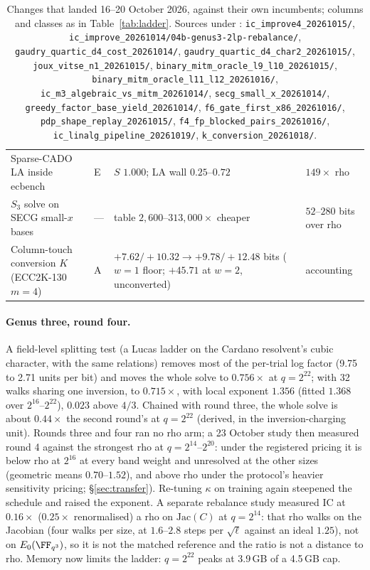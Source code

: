 \begin{table}[p]
\begin{tabularx}{\linewidth}{@{}>{\raggedright}Xl>{\raggedright}p{3.6cm}>{\raggedright\arraybackslash}p{3.2cm}@{}}
Sparse-CADO LA inside ecbench & E & $S$ $1.000$; LA wall $0.25$--$0.72$ & $149\times$ rho \\
$S_3$ solve on SECG small-$x$ bases & --- & table $2{,}600$--$313{,}000\times$ cheaper & $52$--$280$ bits over rho \\
Column-touch conversion $K$ (ECC2K-130 $m=4$) & A & $+7.62/+10.32\to+9.78/+12.48$ bits ($w=1$ floor; $+45.71$ at $w=2$, unconverted) & accounting \\
\bottomrule
\end{tabularx}
\caption[]{Changes that landed 16--20 October 2026, against their own
incumbents; columns and classes as in Table~\ref{tab:ladder}. Sources under
: \texttt{ic\_improve4\_20261015/},
\texttt{ic\_improve\_20261014/04b-genus3-2lp-rebalance/},
\texttt{gaudry\_quartic\_d4\_cost\_20261014/},
\texttt{gaudry\_quartic\_d4\_char2\_20261015/},
\texttt{joux\_vitse\_n1\_20261015/}, \texttt{binary\_mitm\_oracle\_l9\_l10\_20261015/},
\texttt{binary\_mitm\_oracle\_l11\_l12\_20261016/},
\texttt{ic\_m3\_algebraic\_vs\_mitm\_20261014/}, \texttt{secg\_small\_x\_20261014/},
\texttt{greedy\_factor\_base\_yield\_20261014/}, \texttt{f6\_gate\_first\_x86\_20261016/},
\texttt{pdp\_shape\_replay\_20261015/}, \texttt{f4\_fp\_blocked\_pairs\_20261016/},
\texttt{ic\_linalg\_pipeline\_20261019/}, \texttt{k\_conversion\_20261018/}.}
\label{tab:ladder2}
\end{table}

\paragraph{Genus three, round four.} A field-level splitting test (a Lucas
ladder on the Cardano resolvent's cubic character, with the same relations)
removes most of the per-trial log factor (9.75 to 2.71 units per bit) and
moves the whole solve to $0.756\times$ at $q=2^{22}$; with 32 walks sharing
one inversion, to $0.715\times$, with local exponent $1.356$ (fitted
$1.368$ over $2^{16}$--$2^{22}$), $0.023$ above $4/3$. Chained with round
three, the whole solve is about $0.44\times$ the second round's at
$q=2^{22}$ (derived, in the inversion-charging unit). Rounds three and four
ran no rho arm; a 23 October study then measured round 4 against the
strongest rho at $q=2^{14}$--$2^{20}$: under the registered pricing it is
below rho at $2^{16}$ at every band weight and unresolved at the other
sizes (geometric means $0.70$--$1.52$), and above rho under the protocol's
heavier sensitivity pricing; \S\ref{sec:transfer}). Re-tuning $\kappa$ on training again steepened the schedule
and raised the exponent. A separate rebalance study measured IC at
$0.16\times$ ($0.25\times$ renormalised) a rho on $\mathrm{Jac}(C)$ at
$q=2^{14}$: that rho walks on the Jacobian (four walks per size, at
$1.6$--$2.8$ steps per $\sqrt\ell$ against an ideal $1.25$), not on
$E_0(\FF_{q^3})$, so it is not the matched reference and the ratio is not
a distance to rho.
Memory now limits the ladder: $q=2^{22}$ peaks at 3.9\,GB of a 4.5\,GB cap.

